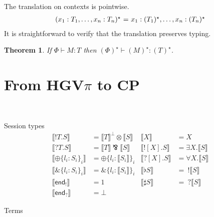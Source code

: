 \documentclass{easychair}
\makeatletter
\newtheorem{theorem}{Theorem}
\newcommand{\ba}{\begin{array}}
\newcommand{\ea}{\end{array}}
\newenvironment{equations}{\[\ba{@{}r@{~}c@{~}l@{}}}{\ea\]}
\newcommand{\key}{\mathsf}
\newcommand{\set}[1]{\{ #1 \}}
\newcommand{\row}[2]{\set{#1}_{#2}}
\newcommand{\gvOutput}[2]{\mathord{!}{#1}.{#2}}
\newcommand{\gvInput}[2]{\mathord{?}{#1}.{#2}}
\newcommand{\gvEndOutput}{\key{end}_!}
\newcommand{\gvEndInput}{\key{end}_?}
\newcommand{\gvPlus}[2]{\oplus \row{#1}{#2}}
\newcommand{\gvChoice}[2]{\binampersand \row{#1}{#2}}
\newcommand{\gvServer}[1]{\flat {#1}}
\newcommand{\gvService}[1]{\sharp {#1}}
\newcommand{\gvOutputType}[2]{![{#1}].{#2}}
\newcommand{\gvInputType}[2]{?[{#1}].{#2}}
\newcommand{\gvj}[3]{{#1} \vdash {#2} : {#3}}
\newcommand{\la}{l}
\newcommand{\cpTimes}[2]{{#1} \otimes {#2}}
\newcommand{\cpPar}[2]{{#1} \mathbin{\bindnasrepma} {#2}}
\newcommand{\cpPlus}[2]{\oplus \row{#1}{#2}}
\newcommand{\cpWith}[2]{\binampersand \row{#1}{#2}}
\newcommand{\cpOne}{1}
\newcommand{\cpBottom}{\bot}
\newcommand{\cpOfCourse}[1]{!{#1}}
\newcommand{\cpWhyNot}[1]{?{#1}}
\newcommand{\cpDual}[1]{{#1}^\bot}
\newcommand{\cpExists}[2]{\exists {#1}.{#2}}
\newcommand{\cpForall}[2]{\forall {#1}.{#2}}
\newcommand{\hgvpi}{HGV$\pi$\xspace}
\newcommand{\lampi}[1]{({#1})^\star}
\newcommand{\hgvcp}[1]{\llbracket{#1}\rrbracket}
\makeatother
\begin{document}
The translation on contexts is pointwise.
\begin{equations}
\lampi{x_1:T_1, \dots, x_n:T_n} &=& x_1:\lampi{T_1}, \dots, x_n:\lampi{T_n} \\
\end{equations}%
It is straightforward to verify that the translation preserves typing.
\begin{theorem}
If $\gvj{\Phi}{M}{T}$ then $\gvj{\lampi{\Phi}}{\lampi{M}}{\lampi{T}}$.
\end{theorem}




\section{From \hgvpi to CP}
~



Session types
\begin{align*}
\hgvcp{\gvOutput{T}{S}}        &= \cpTimes{\cpDual{\hgvcp{T}}}{\hgvcp{S}} & \hgvcp{X}                       &= X \\
\hgvcp{\gvInput{T}{S}}         &= \cpPar{\hgvcp{T}}{\hgvcp{S}} & \hgvcp{\gvOutputType{X}{S}}     &= \cpExists{X}{\hgvcp{S}} \\
\hgvcp{\gvPlus{\la_i:S_i}{i}}   &= \cpPlus{\la_i:\hgvcp{S_i}}{i} & \hgvcp{\gvInputType{X}{S}}      &= \cpForall{X}{\hgvcp{S}} \\
\hgvcp{\gvChoice{\la_i:S_i}{i}} &= \cpWith{\la_i:\hgvcp{S_i}}{i} & \hgvcp{\gvServer{S}}  &=\: \cpOfCourse{\hgvcp{S}} \\
\hgvcp{\gvEndOutput}              &= \cpOne & \hgvcp{\gvService{S}} &= \: \cpWhyNot{\hgvcp{S}} \\
\hgvcp{\gvEndInput}               &= \cpBottom
\end{align*}

Terms

\newcommand{\hgvcpl}{\left\llbracket}
\newcommand{\hgvcpr}{\right\rrbracket}
\end{document}
